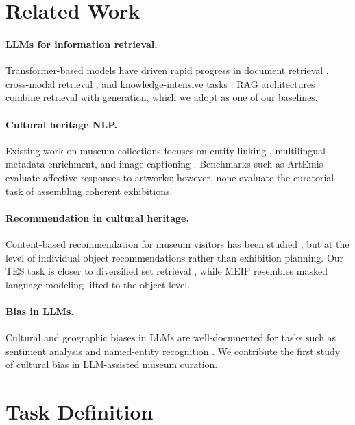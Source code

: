 \documentclass[11pt]{article}
\begin{document}
\section{Related Work}
\label{sec:related}

\paragraph{LLMs for information retrieval.}
Transformer-based models have driven rapid progress in document retrieval
\citep{karpukhin2020dense}, cross-modal retrieval \citep{radford2021clip}, and
knowledge-intensive tasks \citep{petroni2019language}.
RAG architectures \citep{lewis2020retrieval} combine retrieval with generation,
which we adopt as one of our baselines.

\paragraph{Cultural heritage NLP.}
Existing work on museum collections focuses on entity linking \citep{efremova2015},
multilingual metadata enrichment, and image captioning \citep{stefanini2022}.
Benchmarks such as ArtEmis \citep{achlioptas2021artemis} evaluate affective
responses to artworks; however, none evaluate the curatorial task of assembling
coherent exhibitions.

\paragraph{Recommendation in cultural heritage.}
Content-based recommendation for museum visitors has been studied
\citep{noh2017}, but at the level of individual object recommendations rather
than exhibition planning.
Our TES task is closer to diversified set retrieval \citep{carbonell1998mmr},
while MEIP resembles masked language modeling lifted to the object level.

\paragraph{Bias in LLMs.}
Cultural and geographic biases in LLMs are well-documented for tasks such as
sentiment analysis and named-entity recognition \citep{hershcovich2022}.
We contribute the first study of cultural bias in LLM-assisted museum curation.

\section{Task Definition}
\label{sec:task}
\end{document}
